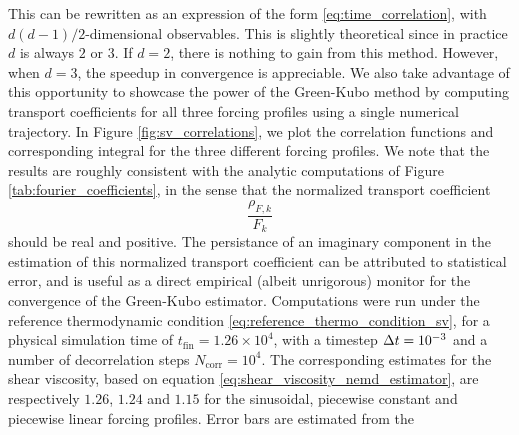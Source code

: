 This can be rewritten as an expression of the form \eqref{eq:time_correlation}, with $d(d-1)/2$-dimensional observables. 
This is slightly theoretical since in practice $d$ is always $2$ or $3$. If $d=2$, there is nothing to gain from this method. 
However, when $d=3$, the speedup in convergence is appreciable. 
We also take advantage of this opportunity to showcase the power of the Green-Kubo method by computing transport coefficients for all three forcing profiles using a single numerical trajectory.
In Figure \eqref{fig:sv_correlations}, we plot the correlation functions and corresponding integral for the three different forcing profiles.
We note that the results are roughly consistent with the analytic computations of Figure \ref{tab:fourier_coefficients}, in the sense that the normalized transport coefficient 
\[\frac{\rho_{F,k}}{F_k}\]
should be real and positive. 
The persistance of an imaginary component in the estimation of this normalized transport coefficient can be attributed to statistical error, and is useful as a direct empirical (albeit unrigorous) monitor for the convergence of the Green-Kubo estimator.
Computations were run under the reference thermodynamic condition \eqref{eq:reference_thermo_condition_sv}, for a physical simulation time of $t_{\mathrm{fin}}=1.26\times 10^4$, with a timestep ${\Delta t}=10^{-3}$ and a number of decorrelation steps $N_{\mathrm{corr}}=10^4$.
The corresponding estimates for the shear viscosity, based on equation \eqref{eq:shear_viscosity_nemd_estimator}, are respectively $1.26$, $1.24$ and $1.15$ for the sinusoidal, piecewise constant and piecewise linear forcing profiles.
Error bars are estimated from the 

